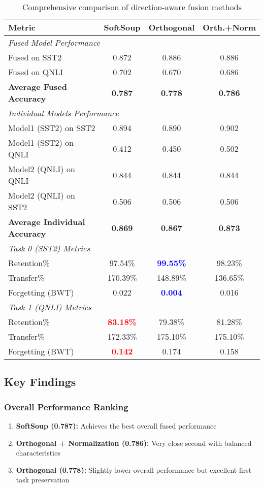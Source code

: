 \documentclass[11pt,a4paper]{article}
\begin{document}
\begin{table}[htbp]
\centering
\caption{Comprehensive comparison of direction-aware fusion methods}
\label{tab:main_results}
\begin{tabular}{@{}lccc@{}}
\toprule
\textbf{Metric} & \textbf{SoftSoup} & \textbf{Orthogonal} & \textbf{Orth.+Norm} \\
\midrule
\multicolumn{4}{l}{\textit{Fused Model Performance}} \\
Fused on SST2 & 0.872 & 0.886 & 0.886 \\
Fused on QNLI & 0.702 & 0.670 & 0.686 \\
\textbf{Average Fused Accuracy} & \textbf{0.787} & \textbf{0.778} & \textbf{0.786} \\
\midrule
\multicolumn{4}{l}{\textit{Individual Models Performance}} \\
Model1 (SST2) on SST2 & 0.894 & 0.890 & 0.902 \\
Model1 (SST2) on QNLI & 0.412 & 0.450 & 0.502 \\
Model2 (QNLI) on QNLI & 0.844 & 0.844 & 0.844 \\
Model2 (QNLI) on SST2 & 0.506 & 0.506 & 0.506 \\
\textbf{Average Individual Accuracy} & \textbf{0.869} & \textbf{0.867} & \textbf{0.873} \\
\midrule
\multicolumn{4}{l}{\textit{Task 0 (SST2) Metrics}} \\
Retention\% & 97.54\% & \textcolor{blue}{\textbf{99.55\%}} & 98.23\% \\
Transfer\% & 170.39\% & 148.89\% & 136.65\% \\
Forgetting (BWT) & 0.022 & \textcolor{blue}{\textbf{0.004}} & 0.016 \\
\midrule
\multicolumn{4}{l}{\textit{Task 1 (QNLI) Metrics}} \\
Retention\% & \textcolor{red}{\textbf{83.18\%}} & 79.38\% & 81.28\% \\
Transfer\% & 172.33\% & 175.10\% & 175.10\% \\
Forgetting (BWT) & \textcolor{red}{\textbf{0.142}} & 0.174 & 0.158 \\
\bottomrule
\end{tabular}
\end{table}

\subsection{Key Findings}

\subsubsection{Overall Performance Ranking}
\begin{enumerate}
    \item \textbf{SoftSoup (0.787):} Achieves the best overall fused performance
    \item \textbf{Orthogonal + Normalization (0.786):} Very close second with balanced characteristics
    \item \textbf{Orthogonal (0.778):} Slightly lower overall performance but excellent first-task preservation
\end{enumerate}
\end{document}
